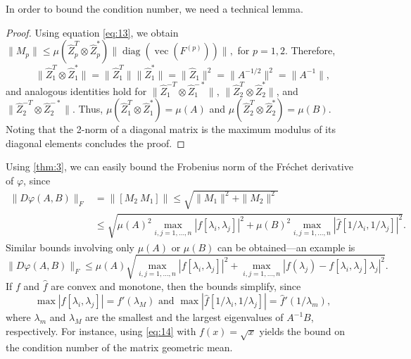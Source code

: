 \documentclass[DIV=14]{scrartcl}
\theoremstyle{thmstyletwo}
\newtheorem{lemma}[theorem]{Lemma}
\theoremstyle{definition}
\numberwithin{equation}{section}
\DeclareMathOperator{\diag}{diag}
\DeclareMathOperator{\opvec}{vec}
\newcommand{\wh}{\widehat}
\newcommand{\D}[2]{D#1(#2)}
\begin{document}
In order to bound the condition number, we need a technical lemma.
\begin{proof}
Using equation \eqref{eq:13}, we obtain
$
    \|M_p\|\le \mu(\wh Z_p^T \otimes \wh Z_p^*)\|\diag(\opvec(F^{(p)}))
    \|,
$
for $p=1,2$.
Therefore,
\[
    \|\wh Z_1^T\otimes \wh Z_1^*\|=\|\wh Z_1^T\|\|\wh Z_1^*\|=\|\wh Z_1\|^2=
     \|A^{-1/2}\|^2 =\|A^{-1}\|,
\]
and analogous identities hold for $\|\wh Z_1^{-T}\otimes \wh Z_1^{-*}\|$, $\|\wh Z_2^T\otimes \wh Z_2^*\|$, and $\|\wh Z_2^{-T}\otimes \wh Z_2^{-*}\|$. Thus,
$
\mu(\wh Z_1^T\otimes \wh Z_1^*)=\mu(A)
$
and
$
\mu(\wh Z_2^T\otimes \wh Z_2^*)=\mu(B).
$
Noting that the 2-norm of a diagonal matrix is the maximum modulus of its diagonal elements concludes the proof.
\end{proof}

Using \cref{thm:3}, we can easily bound the Frobenius norm of the Fréchet derivative of $\varphi$, since
\[
\begin{split}
    \|D\varphi(A,B)\|_F & = \|[M_2\ M_1]\|\le\sqrt{\|M_1\|^2+\|M_2\|^2}\\
    & \le \sqrt{\mu(A)^2\max_{i,j=1,\ldots,n}|f[\lambda_i,\lambda_j]|^2
    +\mu(B)^2\max_{i,j=1,\ldots,n}|\wh f[1/\lambda_i,1/\lambda_j]|^2}.
    \end{split}
\]
Similar bounds involving only $\mu(A)$ or $\mu(B)$ can be obtained---an example is
\begin{equation}\label{eq:14}
    \|\D{\varphi}{A,B}\|_F \le
    \mu(A)\sqrt{\max_{i,j=1,\ldots,n }|f[\lambda_i,\lambda_j]|^2+\max_{i,j=1,\ldots,n} |f(\lambda_j)-f[\lambda_i,\lambda_j]\lambda_j|^2}.
\end{equation}
If $f$ and $\wh f$ are convex and monotone, then the bounds simplify, since
\begin{equation*}
\max |f[\lambda_i,\lambda_j]|=f'(\lambda_M)
\text{ and }
\max |\wh f[1/\lambda_i,1/\lambda_j]|={\wh f}'(1/\lambda_m),
\end{equation*}
where $\lambda_m$ and $\lambda_M$ are the smallest and the largest eigenvalues of $A^{-1}B$, respectively.
For instance, using \eqref{eq:14} with $f(x)=\sqrt{x}$ yields the bound \cite[eq.~8]{bi24} on the condition number of the matrix geometric mean.
\end{document}
